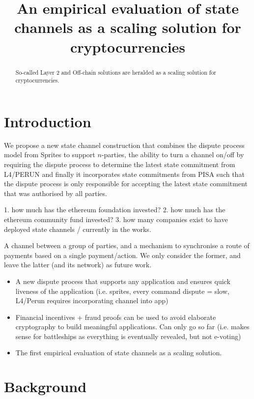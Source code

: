 \documentclass{llncs}
\begin{document}
	\title{An empirical evaluation of state channels as a scaling solution for cryptocurrencies}
	\maketitle
	\begin{abstract}
		So-called Layer 2 and Off-chain solutions are heralded as a scaling solution for cryptocurrencies. 
	\end{abstract} 

\section{Introduction}

We propose a new state channel construction that combines the dispute process model from Sprites to support $n$-parties, the ability to turn a channel on/off by requiring the dispute process to determine the latest state commitment from L4/PERUN and finally it incorporates state commitments from PISA such that the dispute process is only responsible for accepting the latest state commitment that was authorised by all parties. 


1. how much has the ethereum foundation invested?
2. how much has the ethereum community fund invested?
3. how many companies exist to have deployed state channels / currently in the works. 


A channel between a group of parties, and a mechanism to synchronise a route of payments based on a single payment/action. We only consider the former, and leave the latter (and its network) as future work. 

\begin{itemize}
\item A new dispute process that supports any application and ensures quick liveness of the application (i.e. sprites, every command dispute = slow, L4/Perun requires incorporating channel into app)
\item Financial incentives + fraud proofs can be used to avoid elaborate cryptography to build meaningful applications. Can only go so far (i.e. makes sense for battleships as everything is eventually revealed, but not e-voting) 
\item The first empirical evaluation of state channels as a scaling solution. 

\end{itemize}
\section{Background}
\end{document}
